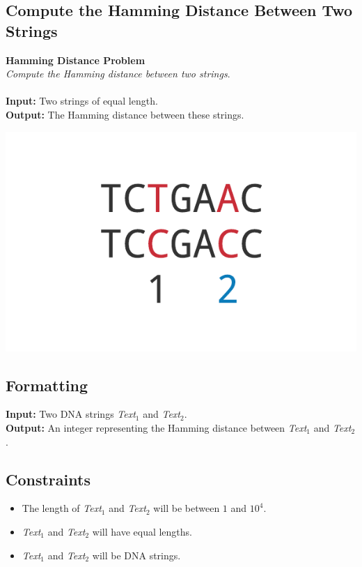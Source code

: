 \documentclass{article}
\begin{document}
\subsection{Compute the Hamming Distance Between Two Strings}
\hline\vspace{5}
\noindent \textbf{Hamming Distance Problem}\\
\emph{Compute the Hamming distance between two strings}.\\ \\
\textbf{Input:} Two strings of equal length.\\
\textbf{Output:} The Hamming distance between these strings.
\begin{center}
    \includegraphics[scale=0.24]{c1/logos/1G.png} 
\end{center}
\hline\vspace{5}

\subsection*{Formatting}
\textbf{Input:} Two DNA strings \emph{Text}$_1$ and \emph{Text}$_2$.\\
\noindent \textbf{Output:} An integer representing the Hamming distance between \emph{Text}$_1$ and \emph{Text}$_2$.

\subsection*{Constraints}
\begin{itemize}
    \item The length of \emph{Text}$_1$ and \emph{Text}$_2$ will be between $1$ and $10^4$.
    \item \emph{Text}$_1$ and \emph{Text}$_2$ will have equal lengths.
    \item \emph{Text}$_1$ and \emph{Text}$_2$ will be DNA strings.
\end{itemize}
\pagebreak
\end{document}
